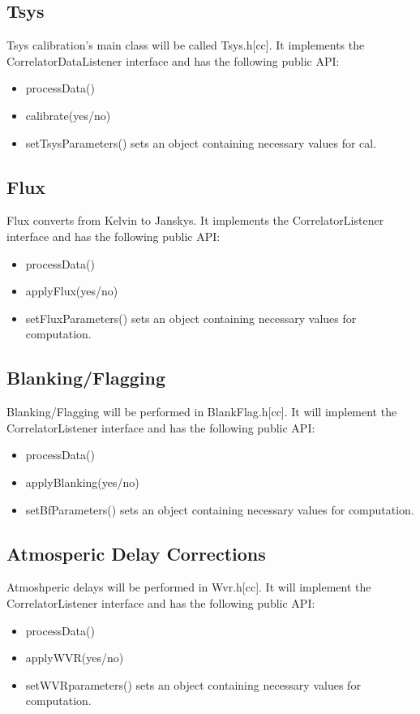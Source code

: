 \documentclass[11pt]{article}
\begin{document}
\subsection{Tsys}
Tsys calibration's main class will be called Tsys.h[cc]. It implements
the CorrelatorDataListener interface and has the following public API:
\begin{itemize}
\item processData()
\item calibrate(yes/no)
\item setTsysParameters() sets an object containing necessary values for cal.
\end{itemize}

\subsection{Flux}
Flux converts from Kelvin to Janskys. It implements the CorrelatorListener
interface and has the following public API:
\begin{itemize}
\item processData()
\item applyFlux(yes/no)
\item setFluxParameters() sets an object containing necessary values for
computation.
\end{itemize}

\subsection{Blanking/Flagging}
Blanking/Flagging will be performed in BlankFlag.h[cc]. It will implement
the CorrelatorListener interface and has the following public API:
\begin{itemize}
\item processData()
\item applyBlanking(yes/no)
\item setBfParameters() sets an object containing necessary values for
computation.
\end{itemize}

\subsection{Atmosperic Delay Corrections}
Atmoshperic delays will be performed in Wvr.h[cc]. It will implement
the CorrelatorListener interface and has the following public API:
\begin{itemize}
\item processData()
\item applyWVR(yes/no)
\item setWVRparameters() sets an object containing necessary values for
computation.
\end{itemize}
\end{document}
